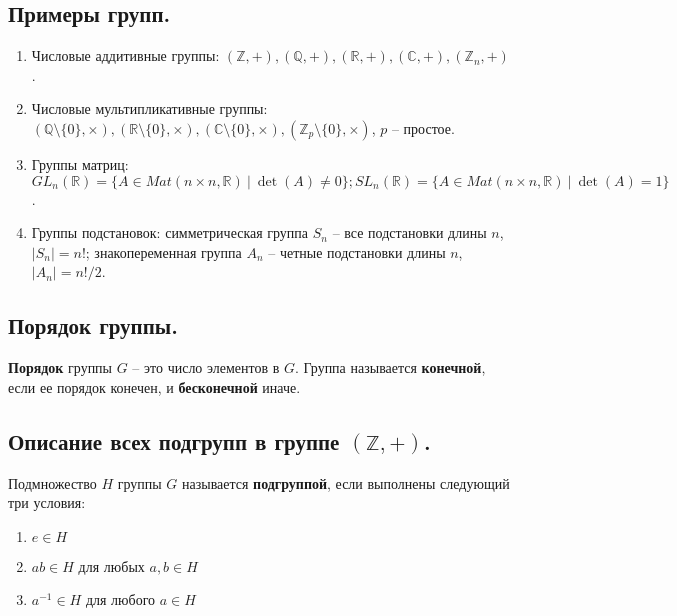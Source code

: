 \subsection{Примеры групп.}
\begin{enumerate}
    \item Числовые аддитивные группы: $(\mathbb{Z}, +), (\mathbb{Q}, +), (\mathbb{R}, +), (\mathbb{C}, +), (\mathbb{Z}_n, +)$.
    \item Числовые мультипликативные группы: $(\mathbb{Q} \setminus \{0\}, \times), (\mathbb{R} \setminus \{0\}, \times), (\mathbb{C} \setminus \{0\}, \times), (\mathbb{Z}_p \setminus \{0\}, \times)$, $p$ -- простое.
    \item Группы матриц: $GL_n(\mathbb{R}) = \{A \in Mat(n \times n, \mathbb{R}) \> | \> \det(A) \neq 0 \}; SL_n(\mathbb{R}) = \{A \in Mat(n \times n, \mathbb{R}) \> | \> \det(A) = 1 \}$.
    \item Группы подстановок: симметрическая группа $S_n$ -- все подстановки длины $n$, $|S_n| = n!$; знакопеременная группа $A_n$ -- четные подстановки длины $n$, $|A_n| = n!/2$.
\end{enumerate}

\subsection{Порядок группы.}
\begin{definition}
    \textbf{Порядок} группы $G$ -- это число элементов в $G$. Группа называется \textbf{конечной}, если ее порядок конечен, и \textbf{бесконечной} иначе.
\end{definition}


\subsection{Описание всех подгрупп в группе $(\mathbb{Z}, +)$.}
\begin{definition}
    Подмножество $H$ группы $G$ называется \textbf{подгруппой}, если выполнены следующий три условия:
    \begin{enumerate}
        \item $e \in H$
        \item $ab \in H$ для любых $a,b \in H$
        \item $a^{-1} \in H$ для любого $a \in H$
    \end{enumerate}
\end{definition}